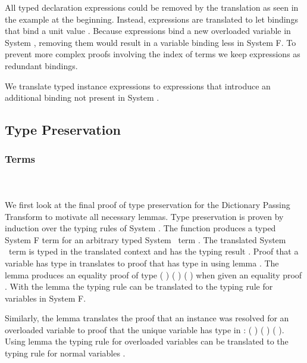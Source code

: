 \noindent All typed declaration expressions  could be removed by the translation as seen in the example at the beginning. 
Instead,  expressions are translated to let bindings that bind a unit value .
Because  expressions bind a new overloaded variable in System \Fo, removing them would result in a variable binding less in System F. To prevent more complex proofs involving the index  of terms we keep  expressions as redundant  bindings. 

\noindent We translate typed instance expressions  to  expressions that introduce an additional binding not present in System \Fo.

\subsection{Type Preservation}
\subsubsection{Terms}\hfill\\\\
We first look at the final proof of type preservation for the Dictionary Passing Transform to motivate all necessary lemmas. 
Type preservation is proven by induction over the typing rules of System \Fo. 
The function  produces a typed System F term for an arbitrary typed System \Fo\ term . 
The translated System \Fo\ term   is typed in the translated context   and has the typing result  .
\DPTTermPres
Proof  that a variable  has type  in  translates to proof that   has type   in   using lemma . 
The lemma produces an equality proof of type  ( ) ( )  ( ) when given an equality proof      .
With the lemma  the typing rule  can be translated to the typing rule for variables in System F. 

\noindent Similarly, the lemma  translates the proof  that an instance  \Constr{:}  was resolved for an overloaded variable  to proof that the unique variable   has type   in  :  ( ) ( )  ( ).  
Using lemma  the typing rule for overloaded variables  can be translated to the typing rule for normal variables .

